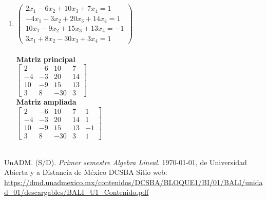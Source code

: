 \documentclass[12pt]{article}
\begin{document}
\begin{enumerate}
\begin{multicols}{2}
\begin{enumerate}
		\item $\begin{pmatrix} 
				 2x_1 - 6x_2 + 10x_3 + 7x_4 = 1 \\
				-4x_1 - 3x_2 + 20x_3 +14x_4 = 1 \\
				10x_1 - 9x_2 + 15x_3 +13x_4 =-1 \\
				 3x_1 + 8x_2 - 30x_3 + 3x_4 = 1
			\end {pmatrix}$
			\\\ \\ \bf Matriz principal \\
			$\begin{bmatrix}
				 2 & -6 & 10 &  7\\
				-4 & -3 & 20 & 14\\
				10 & -9 & 15 & 13\\
				 3 &  8 &-30 &  3
			\end{bmatrix}$
			\\ \bf Matriz ampliada \\
			$\begin{bmatrix}
				 2 & -6 & 10 &  7 & 1\\
				-4 & -3 & 20 & 14 & 1\\
				10 & -9 & 15 & 13 &-1\\
				 3 &  8 &-30 &  3 & 1
			\end{bmatrix}$\\\ \\
			
	\end{enumerate}\end{multicols}
\end{enumerate}



\newpage
\begin{thebibliography}{X}
	 UnADM. (S/D). \emph{Primer semestre Algebra Lineal}. \today, de Universidad Abierta y a Distancia de México \textbar{} DCSBA
Sitio web:
\url{https://dmd.unadmexico.mx/contenidos/DCSBA/BLOQUE1/BI/01/BALI/unidad_01/descargables/BALI_U1_Contenido.pdf}
\end{thebibliography}
\end{document}

